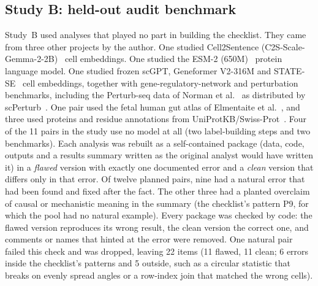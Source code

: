 \documentclass[10pt,letterpaper]{article}
\begin{document}
\subsection*{Study B: held-out audit benchmark}
Study~B used analyses that played no part in building the checklist.
They came from three other projects by the author. One studied
Cell2Sentence (C2S-Scale-Gemma-2-2B)~\cite{rizvi2025c2sscale} cell
embeddings. One studied the ESM-2 (650M)~\cite{lin2023esm2} protein
language model. One studied frozen scGPT, Geneformer V2-316M and
STATE-SE~\cite{adduri2025state} cell embeddings, together with
gene-regulatory-network and perturbation benchmarks, including the
Perturb-seq data of Norman et al.~\cite{norman2019exploring} as
distributed by scPerturb~\cite{peidli2024scperturb}. One pair used the
fetal human gut atlas of Elmentaite et al.~\cite{elmentaite2020gut}, and
three used proteins and residue annotations from
UniProtKB/Swiss-Prot~\cite{uniprot2025}. Four of the 11 pairs
in the study use no model at all (two label-building steps and two
benchmarks). Each analysis was rebuilt as a self-contained package (data,
code, outputs and a results summary written as the original analyst would
have written it) in a \emph{flawed} version with exactly one documented
error and a \emph{clean} version that differs only in that error. Of
twelve planned pairs, nine had a natural error that had been found and
fixed after the fact. The other three had a planted overclaim of causal
or mechanistic meaning in the summary (the checklist's pattern P9, for
which the pool had no natural example). Every package was checked by
code: the flawed version reproduces its wrong result, the clean version
the correct one, and comments or names that hinted at the error were
removed. One natural pair failed this check and was dropped, leaving 22
items (11 flawed, 11 clean; 6 errors inside the checklist's patterns and
5 outside, such as a circular statistic that breaks on evenly spread
angles or a row-index join that matched the wrong cells).
\end{document}

